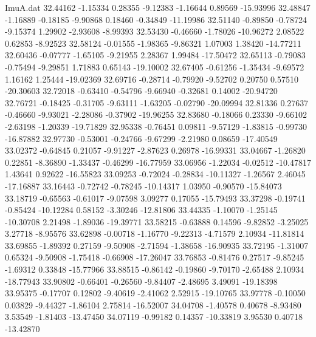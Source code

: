 \begin{filecontents}{ImuA.dat}
  32.44162   -1.15334    0.28355   -9.12383   -1.16644    0.89569  -15.93996
  32.48847   -1.16889   -0.18185   -9.90868    0.18460   -0.34849  -11.19986
  32.51140   -0.89850   -0.78724   -9.15374    1.29902   -2.93608   -8.99393
  32.53430   -0.46660   -1.78026  -10.96272    2.08522    0.62853   -8.92523
  32.58124   -0.01555   -1.98365   -9.86321    1.07003    1.38420  -14.77211
  32.60436   -0.07777   -1.65105   -9.21955    2.28367    1.99484  -17.50472
  32.65113   -0.79083   -0.75494   -9.29851    1.71883    0.65143  -19.10002
  32.67405   -0.61256   -1.35434   -9.69572    1.16162    1.25444  -19.02369
  32.69716   -0.28714   -0.79920   -9.52702    0.20750    0.57510  -20.30603
  32.72018   -0.63410   -0.54796   -9.66940   -0.32681    0.14002  -20.94720
  32.76721   -0.18425   -0.31705   -9.63111   -1.63205   -0.02790  -20.09994
  32.81336    0.27637   -0.46660   -9.93021   -2.28086   -0.37902  -19.96255
  32.83680   -0.18066    0.23330   -9.66102   -2.63198   -1.20339  -19.71829
  32.95338   -0.76451    0.09811   -9.57129   -1.83815   -0.99730  -16.87882
  32.97730   -0.53001   -0.24766   -9.67299   -2.21980    0.08659  -17.40549
  33.02372   -0.64845    0.21057   -9.91227   -2.87623    0.26978  -16.99331
  33.04667   -1.26820    0.22851   -8.36890   -1.33437   -0.46299  -16.77959
  33.06956   -1.22034   -0.02512  -10.47817    1.43641    0.92622  -16.55823
  33.09253   -0.72024   -0.28834  -10.11327   -1.26567    2.46045  -17.16887
  33.16443   -0.72742   -0.78245  -10.14317    1.03950   -0.90570  -15.84073
  33.18719   -0.65563   -0.61017   -9.07598    3.09277    0.17055  -15.79493
  33.37298   -0.19741   -0.85424  -10.12284    0.58152   -3.30246  -12.81806
  33.44335   -1.10070   -1.25145  -10.30708    2.21498   -1.89036  -19.39771
  33.58215   -0.63888    0.14596   -9.82852   -3.25025    3.27718   -8.95576
  33.62898   -0.00718   -1.16770   -9.22313   -4.71579    2.10934  -11.81814
  33.69855   -1.89392    0.27159   -9.50908   -2.71594   -1.38658  -16.90935
  33.72195   -1.31007    0.65324   -9.50908   -1.75418   -0.66908  -17.26047
  33.76853   -0.81476    0.27517   -9.85245   -1.69312    0.33848  -15.77966
  33.88515   -0.86142   -0.19860   -9.70170   -2.65488    2.10934  -18.77943
  33.90802   -0.66401   -0.26560   -9.84407   -2.48695    3.49091  -19.18398
  33.95375   -0.17707    0.12802   -9.40619   -2.41062    2.52915  -19.10765
  33.97778   -0.10050    0.03829   -9.44327   -1.86104    2.75814  -16.52007
  34.04708   -1.40578    0.40678   -8.93480    3.53549   -1.81403  -13.47450
  34.07119   -0.99182    0.14357  -10.33819    3.95530    0.40718  -13.42870

\end{filecontents}
